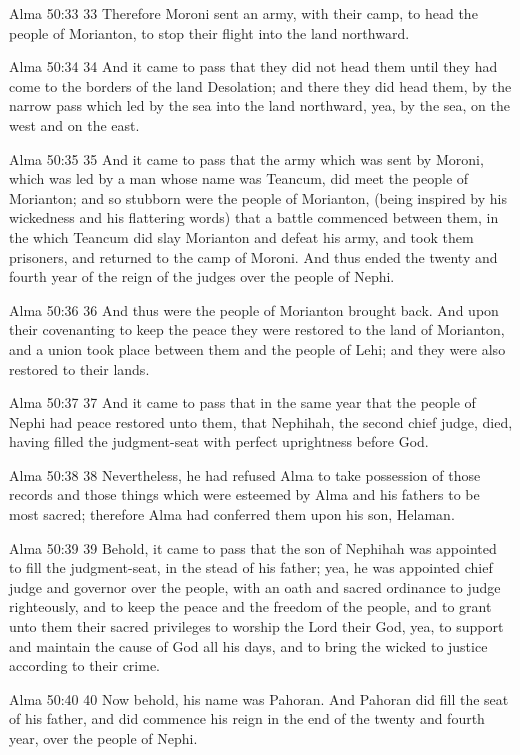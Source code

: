 Alma 50:33
 33 Therefore Moroni sent an army, with their camp, to head the
people of Morianton, to stop their flight into the land
northward.

Alma 50:34
 34 And it came to pass that they did not head them until they
had come to the borders of the land Desolation; and there they
did head them, by the narrow pass which led by the sea into the
land northward, yea, by the sea, on the west and on the east.

Alma 50:35
 35 And it came to pass that the army which was sent by Moroni,
which was led by a man whose name was Teancum, did meet the
people of Morianton; and so stubborn were the people of
Morianton, (being inspired by his wickedness and his flattering
words) that a battle commenced between them, in the which Teancum
did slay Morianton and defeat his army, and took them prisoners,
and returned to the camp of Moroni. And thus ended the twenty
and fourth year of the reign of the judges over the people of
Nephi.

Alma 50:36
 36 And thus were the people of Morianton brought back. And upon
their covenanting to keep the peace they were restored to the
land of Morianton, and a union took place between them and the
people of Lehi; and they were also restored to their lands.

Alma 50:37
 37 And it came to pass that in the same year that the people of
Nephi had peace restored unto them, that Nephihah, the second
chief judge, died, having filled the judgment-seat with perfect
uprightness before God.

Alma 50:38
 38 Nevertheless, he had refused Alma to take possession of those
records and those things which were esteemed by Alma and his
fathers to be most sacred; therefore Alma had conferred them upon
his son, Helaman.

Alma 50:39
 39 Behold, it came to pass that the son of Nephihah was
appointed to fill the judgment-seat, in the stead of his father;
yea, he was appointed chief judge and governor over the people,
with an oath and sacred ordinance to judge righteously, and to
keep the peace and the freedom of the people, and to grant unto
them their sacred privileges to worship the Lord their God, yea,
to support and maintain the cause of God all his days, and to
bring the wicked to justice according to their crime.

Alma 50:40
 40 Now behold, his name was Pahoran. And Pahoran did fill the
seat of his father, and did commence his reign in the end of the
twenty and fourth year, over the people of Nephi.

